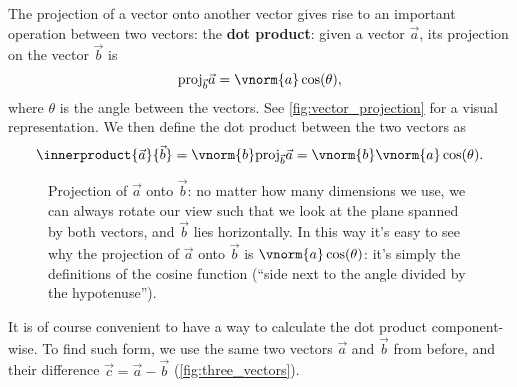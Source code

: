 The projection of a vector onto another vector gives rise to an important operation between two vectors: the \textbf{dot product}: given a vector $\vec{a}$, its projection on the vector $\vec{b}$ is
\begin{equation}
	\text{proj}_{\vec{b}}\vec{a} = \vnorm{a}\cos(\theta),
	\label{eq:vector_projection}
\end{equation}
where $\theta$ is the angle between the vectors. See \autoref{fig:vector_projection} for a visual representation. We then define the dot product between the two vectors as
\begin{equation}
	\innerproduct{\vec{a}}{\vec{b}} = \vnorm{b}\text{proj}_{\vec{b}}\vec{a} = \vnorm{b}\vnorm{a}\cos(\theta).
	\label{eq:label}
\end{equation}

\begin{figure}
	\begin{center}
	\end{center}
	\caption{Projection of $\vec{a}$ onto $\vec{b}$: no matter how many dimensions we use, we can always rotate our view such that we look at the plane spanned by both vectors, and $\vec{b}$ lies horizontally. In this way it's easy to see why the projection of $\vec{a}$ onto $\vec{b}$ is $\vnorm{a}\cos(\theta)$: it's simply the definitions of the cosine function (\enquote{side next to the angle divided by the hypotenuse}).}
	\label{fig:vector_projection}
\end{figure}

It is of course convenient to have a way to calculate the dot product component-wise. To find such form, we use the same two vectors $\vec{a}$ and $\vec{b}$ from before, and their difference $\vec{c}=\vec{a}-\vec{b}$ (\autoref{fig:three_vectors}).

